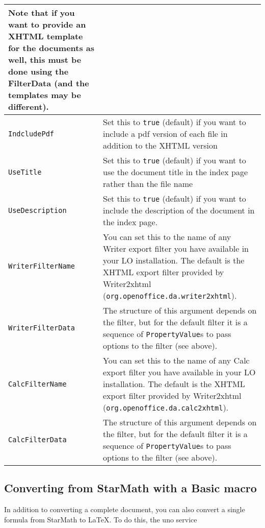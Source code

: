 \documentclass{article}
\newcommand\textstyleSourceText[1]{\texttt{\textmd{#1}}}
\begin{document}
\begin{center}
\begin{tabular}{|m{4.4830003cm}|m{12.13cm}|}
{\mdseries Note that if you want to provide an XHTML template for the documents as well, this must be done using the FilterData (and the templates may be different).}\\\hline
{\mdseries \textstyleSourceText{IndcludePdf}} &
{\mdseries Set this to \textstyleSourceText{true} (default) if you want to include a pdf version of each file in addition to the XHTML version}\\\hline
{\mdseries \textstyleSourceText{UseTitle}} &
{\mdseries Set this to \textstyleSourceText{true} (default) if you want to use the document title in the index page rather than the file name}\\\hline
{\mdseries \textstyleSourceText{UseDescription}} &
{\mdseries Set this to \textstyleSourceText{true} (default) if you want to include the description of the document in the index page.}\\\hline
{\mdseries \textstyleSourceText{WriterFilterName}} &
{\mdseries You can set this to the name of any Writer export filter you have available in your LO installation. The default is the XHTML export filter provided by Writer2xhtml (\textstyleSourceText{org.openoffice.da.writer2xhtml}).}\\\hline
{\mdseries \textstyleSourceText{WriterFilterData}} &
{\mdseries The structure of this argument depends on the filter, but for the default filter it is a sequence of \textstyleSourceText{PropertyValue}s to pass options to the filter (see above).}\\\hline
{\mdseries \textstyleSourceText{CalcFilterName}} &
{\mdseries You can set this to the name of any Calc export filter you have available in your LO installation. The default is the XHTML export filter provided by Writer2xhtml (\textstyleSourceText{org.openoffice.da.calc2xhtml}).}\\\hline
{\mdseries \textstyleSourceText{CalcFilterData}} &
{\mdseries The structure of this argument depends on the filter, but for the default filter it is a sequence of \textstyleSourceText{PropertyValue}s to pass options to the filter (see above).}\\\hline
\end{tabular}
\end{center}
\subsection{Converting from StarMath with a Basic macro}
{\mdseries
In addition to converting a complete document, you can also convert a single formula from StarMath to LaTeX. To do this, the uno service}
\end{document}
